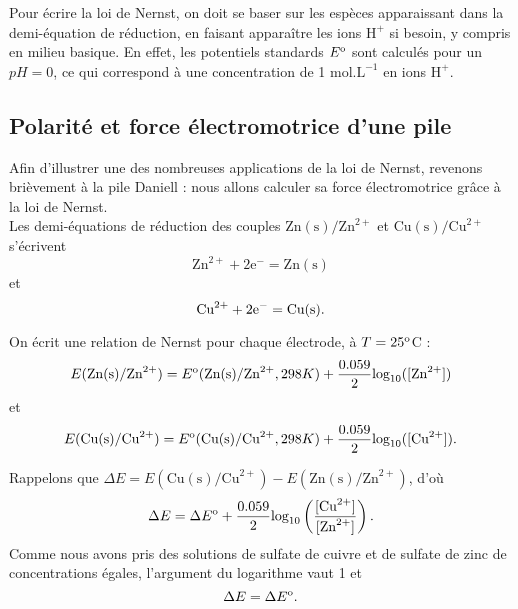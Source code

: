 \documentclass[11pt,a4paper]{report}
\begin{document}
Pour écrire la loi de Nernst, on doit se baser sur les espèces apparaissant dans la demi-équation de réduction, en faisant apparaître les ions $\text{H}^+$ si besoin, y compris en milieu basique. En effet, les potentiels standards $E\textsuperscript{o}$ sont calculés pour un $pH = 0$, ce qui correspond à une concentration de 1 $\text{mol.L}^{-1}$ en ions $\text{H}^\text{+}$.\\


\subsection{Polarité et force électromotrice d'une pile}

Afin d'illustrer une des nombreuses applications de la loi de Nernst, revenons brièvement à la pile Daniell : nous allons calculer sa force électromotrice grâce à la loi de Nernst.\\ 

Les demi-équations de réduction des couples $\text{Zn}(\text{s})/\text{Zn}^{2+}$ et $\text{Cu}(\text{s})/\text{Cu}^{2+}$ s'écrivent 
\begin{equation}
	\text{Zn}^{2+} + 2\text{e}^- = \text{Zn}(\text{s})
\end{equation}
et 
\begin{equation}
	\text{Cu}^{2+} + 2\text{e}^- = \text{Cu}(\text{s}).\\
\end{equation}

On écrit une relation de Nernst pour chaque électrode, à $T = 25\textsuperscript{o}$C :
\begin{equation}
 	E(\text{Zn}(\text{s})/\text{Zn}^{2+}) = E\textsuperscript{o}(\text{Zn}(\text{s})/\text{Zn}^{2+}, 298 K) + \frac{0.059}{2}\text{log}_{10}([\text{Zn}^{2+}])
\end{equation}
et
\begin{equation}
	E(\text{Cu}(\text{s})/\text{Cu}^{2+}) = E\textsuperscript{o}(\text{Cu}(\text{s})/\text{Cu}^{2+}, 298 K) + \frac{0.059}{2}\text{log}_{10}([\text{Cu}^{2+}]).\\ 
\end{equation}

Rappelons que $\Delta E = E(\text{Cu}(\text{s})/\text{Cu}^{2+}) - E(\text{Zn}(\text{s})/\text{Zn}^{2+})$, d'où
\begin{equation}
	\Delta E = \Delta E\textsuperscript{o} + \frac{0.059}{2}\text{log}_{10}\left(\frac{[\text{Cu}^{2+}]}{[\text{Zn}^{2+}]}\right).
\end{equation}
Comme nous avons pris des solutions de sulfate de cuivre et de sulfate de zinc de concentrations égales, l'argument du logarithme vaut 1 et
\begin{equation}
	\Delta E = \Delta E\textsuperscript{o}.\\
\end{equation}
\end{document}
